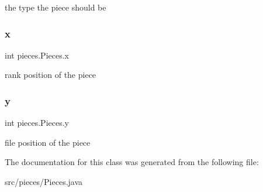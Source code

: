 the type the piece should be \mbox{\label{classpieces_1_1_pieces_ac5178f9b8a6b0c4235851475081249f3}} 
\subsubsection{\texorpdfstring{x}{x}}
{\footnotesize\ttfamily int pieces.\+Pieces.\+x\hspace{0.3cm}{\ttfamily [protected]}}

rank position of the piece \mbox{\label{classpieces_1_1_pieces_a66d911734967a8ced1b9792fe900fadb}} 
\subsubsection{\texorpdfstring{y}{y}}
{\footnotesize\ttfamily int pieces.\+Pieces.\+y\hspace{0.3cm}{\ttfamily [protected]}}

file position of the piece 

The documentation for this class was generated from the following file\+:\begin{DoxyCompactItemize}
\item 
src/pieces/Pieces.\+java\end{DoxyCompactItemize}

